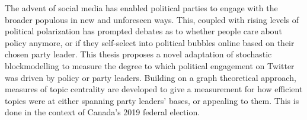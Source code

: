 The advent of social media has enabled political parties to engage with the
broader populous in new and unforeseen ways. This, coupled with rising levels of
political polarization has prompted debates as to whether people care about
policy anymore, or if they self-select into political bubbles online based on
their chosen party leader. This thesis proposes a novel adaptation of stochastic
blockmodelling to measure the degree to which political engagement on Twitter
was driven by policy or party leaders. Building on a graph theoretical approach,
measures of topic centrality are developed to give a measurement for how
efficient topics were at either spanning party leaders' bases, or appealing to
them. This is done in the context of Canada's 2019 federal election.

